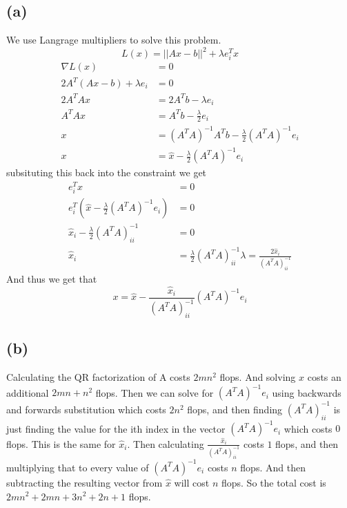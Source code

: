 \subsection*{(a)}
We use Langrage multipliers to solve this problem.\\
$$L(x)=||Ax-b||^2+\lambda e_i^T x$$
\begin{align*}
    \nabla L(x)&=0\\
    2A^T(Ax-b)+\lambda e_i&=0\\
    2A^TAx&=2A^Tb-\lambda e_i\\
    A^TAx&=A^Tb-\frac{\lambda}{2} e_i\\
    x&=(A^TA)^{-1}A^Tb-\frac{\lambda}{2}(A^TA)^{-1}e_i\\
    x&=\hat{x}-\frac{\lambda}{2}(A^TA)^{-1}e_i
\end{align*}
subsituting this back into the constraint we get
\begin{align*}
    e_i^T x&=0\\
    e_i^T\left(\hat{x}-\frac{\lambda}{2}(A^TA)^{-1}e_i\right)&=0\\
    \hat{x}_i-\frac{\lambda}{2}(A^TA)^{-1}_{ii}&=0\\
    \hat{x}_i&=\frac{\lambda}{2}(A^TA)^{-1}_{ii}
    \lambda=\frac{2\hat{x}_i}{(A^TA)^{-1}_{ii}}
\end{align*}
And thus we get that
$$x=\hat{x}-\frac{\hat{x}_i}{(A^TA)^{-1}_{ii}}(A^TA)^{-1}e_i$$
\subsection*{(b)}
Calculating the QR factorization of A costs $2mn^2$ flops. 
And solving $\hat{x}$ costs an additional $2mn+n^2$ flops.
Then we can solve for $(A^TA)^{-1}e_i$ using 
backwards and forwards substitution which costs $2n^2$ flops, and 
then finding $(A^TA)^{-1}_{ii}$ is just finding the value
for the ith index in the vector $(A^TA)^{-1}e_i$ which costs $0$ flops.
This is the same for $\hat{x}_i$. Then calculating 
$\frac{\hat{x}_i}{(A^TA)^{-1}_{ii}}$ costs $1$ flops, and then multiplying
that to every value of $(A^TA)^{-1}e_i$ costs $n$ flops. And then subtracting the resulting
vector from $\hat{x}$ will cost $n$ flops. So the total cost is
$\boxed{2mn^2+2mn+3n^2+2n+1}$ flops.
